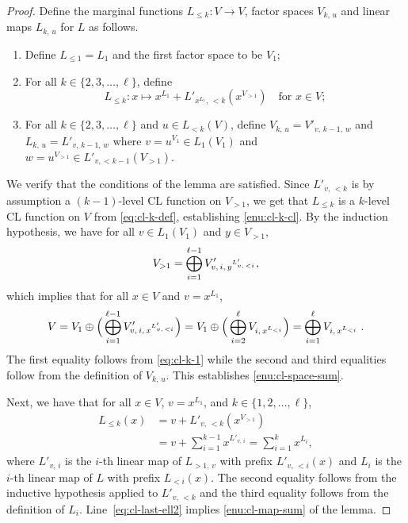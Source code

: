 \documentclass[11pt]{article}
\theoremstyle{definition}
\begin{document}
\begin{proof}
  Define the marginal functions $L_{\le k} : V \to V$, factor spaces
  $V_{k,\, u}$ and linear maps $L_{k,\, u}$ for $L$ as follows.
  \begin{enumerate}[label=(\roman*)]
  \item Define $L_{\le 1} = L_1$ and the first factor space to be $V_1$;
  \item For all $k \in \{2, 3, \ldots, \ell\}$, define
    \begin{equation}
      \label{eq:cl-k-def}
      L_{\le k}: x \mapsto x^{L_1} + L'_{x^{L_1},\, <k} (x^{V_{>1}})
      \quad\text{for } x\in V;
    \end{equation}
	\item For all $k \in \{2, 3, \ldots, \ell\}$ and $u \in L_{< k}(V)$, define
    $V_{k,\, u} = V'_{v,\, k-1,\, w}$ and $L_{k,\, u} = L'_{v,\, k-1,\, w}$
    where $v = u^{V_1} \in L_{1}(V_{1})$ and $w = u^{V_{>1}} \in L'_{v,< k-1}(V_{> 1})$.
  \end{enumerate}
  We verify that the conditions of the lemma are satisfied.
  Since $L'_{v,\, < k}$ is by assumption a $(k-1)$-level CL function on $V_{>
    1}$, we get that $L_{\leq k}$ is a $k$-level CL function on $V$ from
  \cref{eq:cl-k-def}, establishing \cref{enu:cl-k-cl}.
  By the induction hypothesis, we have for all $v\in L_1(V_1)$ and $y \in
  V_{>1}$,
  \begin{equation}
    \label{eq:cl-k-1}
    V_{>1} = \bigoplus_{i=1}^{\ell-1}
    V'_{\smash{v,\, i, \, y^{L'_{v,\, <i}}}},
  \end{equation}
  which implies that for all $x \in V$ and $v = x^{L_1}$,
  \begin{equation*}
    V = V_1 \oplus \Big ( \bigoplus_{i=1}^{\ell-1}
    V'_{\smash{v,\, i, \, x^{L'_{v,\, <i}}}} \Big)
    = V_1 \oplus \Big (\bigoplus_{i=2}^{\ell} V_{i,\, x^{L_{<i}}} \Big)
    = \bigoplus_{i=1}^\ell V_{i,\, x^{L_{<i}}}\;.
  \end{equation*}
  The first equality follows from \cref{eq:cl-k-1} while the second and third
  equalities follow from the definition of $V_{k,\, u}$.
  This establishes \cref{enu:cl-space-sum}.

  Next, we have that for all $x \in V$, $v = x^{L_1}$, and $k \in
  \{1,2,\ldots,\ell\}$,
  \begin{align}
    \label{eq:cl-last-ell}
    L_{\leq k}(x)
    & = v + L'_{v,\, <k} (x^{V_{>1}}) \\
    & = v + \sum_{i=1}^{k-1} x^{L'_{v,\, i}}
    = \sum_{i = 1}^{k} x^{L_{i}}, \label{eq:cl-last-ell2}
  \end{align}
  where $L'_{v,\, i}$ is the $i$-th linear map of $L_{>1,\, v}$ with prefix
  $L'_{v,\, <i}(x)$ and $L_i$ is the $i$-th linear map of $L$ with prefix
  $L_{<i}(x)$.
  The second equality follows from the inductive hypothesis applied to $L'_{v,\,
    <k}$ and the third equality follows from the definition of $L_{i}$.
  Line~\eqref{eq:cl-last-ell2} implies \cref{enu:cl-map-sum} of the lemma.
  

\end{proof}
\end{document}
